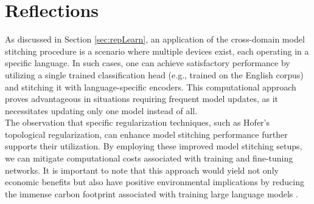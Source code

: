 \documentclass[../main.tex]{subfiles}
\begin{document}
\section{Reflections}
\label{sec:reflections}

As discussed in Section \ref{sec:repLearn}, an application of the cross-domain model stitching procedure is a scenario where multiple devices exist, each operating in a specific language. In such cases, one can achieve satisfactory performance by utilizing a single trained classification head (e.g., trained on the English corpus) and stitching it with language-specific encoders. This computational approach proves advantageous in situations requiring frequent model updates, as it necessitates updating only one model instead of all.\\

The observation that specific regularization techniques, such as Hofer's topological regularization, can enhance model stitching performance further supports their utilization. By employing these improved model stitching setups, we can mitigate computational costs associated with training and fine-tuning networks. It is important to note that this approach would yield not only economic benefits but also have positive environmental implications by reducing the immense carbon footprint associated with training large language models \cite{strubell_energy_2019}.
\end{document}
